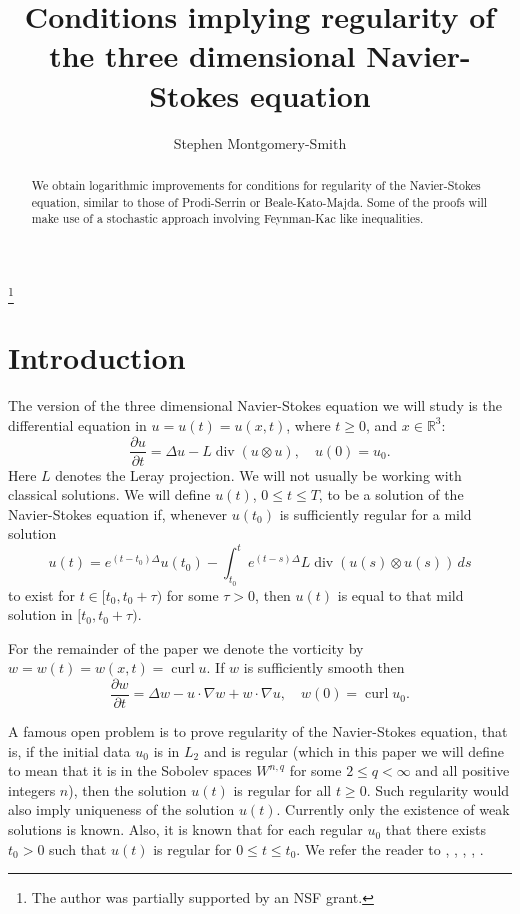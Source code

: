 \documentclass[12pt]{amsart}
\theoremstyle{remark}
\newcommand{\R}{{\mathbb R}}
\DeclareMathOperator{\curl}{curl}
\DeclareMathOperator{\divergence}{div}
\begin{document}
\title[Regularity of Navier-Stokes]
{Conditions implying regularity of the three dimensional Navier-Stokes
equation}
\author{Stephen Montgomery-Smith}
\makeatletter
\address{Department of Mathematics,
University of Missouri,
Columbia, MO 65211}
\thanks{The author was
partially supported
by an NSF grant.}

\begin{abstract}
We obtain logarithmic improvements for 
conditions for regularity of the
Navier-Stokes equation, similar to those of Prodi-Serrin or
Beale-Kato-Majda.  
Some of the proofs will make use
of a stochastic approach involving Feynman-Kac like inequalities.
\end{abstract}

\maketitle

\section{Introduction}

The version of the three dimensional
Navier-Stokes equation we will study is the
differential equation in
$u = u(t) = u(x,t)$, where $ t\ge 0$, and $x \in \R^3$:
$$ \frac{\partial u}{\partial t}
   = \Delta u - L\divergence(u \otimes u),
   \quad u(0) = u_0.$$
Here $L$ denotes the Leray projection.
We will not usually be working with classical solutions.  We will define
$u(t)$, $0 \le t \le T$,
to be a solution of the Navier-Stokes equation if, whenever $u(t_0)$ is 
sufficiently regular for a mild solution
$$ u(t) = e^{(t-t_0)\Delta} u(t_0) - \int_{t_0}^t
   e^{(t-s)\Delta} L\divergence(u(s) \otimes u(s)) \, ds $$   
to exist for 
$t \in [t_0,t_0+\tau)$ for some $\tau>0$, 
then $u(t)$ is equal to that mild solution in $[t_0,t_0+\tau)$.

For the remainder of the paper
we denote the vorticity by $w = w(t) = w(x,t) = \curl u$.
If $w$ is sufficiently smooth then
$$ \frac{\partial w}{\partial t}
   = \Delta w - u \cdot \nabla w + w \cdot \nabla u ,
   \quad w(0) = \curl u_0 .$$

A famous open problem is to prove regularity of the Navier-Stokes
equation, that is, if the initial data $u_0$ is in $L_2$ and is
regular (which in this paper we will define to mean that it is
in the Sobolev spaces $W^{n,q}$ for some $2\le q<\infty$ and all positive
integers $n$), then the solution $u(t)$ is regular for all
$t\ge0$.  Such regularity would also imply uniqueness of the solution
$u(t)$.  Currently only the existence of weak solutions is known.
Also, it is known that for each regular $u_0$ that there exists
$t_0>0$ such that $u(t)$ is regular for $0\le t \le t_0$.
We refer the reader to 
\cite{cannone}, \cite{constantin-foias}, \cite{doering-gibbons},
\cite{lemarie-rieusset}, \cite{temam}.
\end{document}
